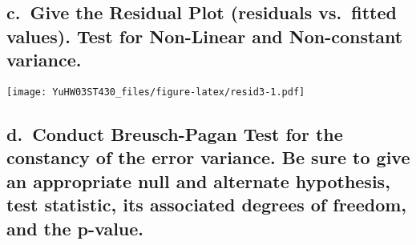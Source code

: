 \documentclass[
]{article}
\newenvironment{Shaded}{\begin{snugshade}}{\end{snugshade}}
\newcommand{\AttributeTok}[1]{\textcolor[rgb]{0.13,0.29,0.53}{#1}}
\newcommand{\DecValTok}[1]{\textcolor[rgb]{0.00,0.00,0.81}{#1}}
\newcommand{\FunctionTok}[1]{\textcolor[rgb]{0.13,0.29,0.53}{\textbf{#1}}}
\newcommand{\NormalTok}[1]{#1}
\newcommand{\OtherTok}[1]{\textcolor[rgb]{0.56,0.35,0.01}{#1}}
\newcommand{\SpecialCharTok}[1]{\textcolor[rgb]{0.81,0.36,0.00}{\textbf{#1}}}
\newcommand{\StringTok}[1]{\textcolor[rgb]{0.31,0.60,0.02}{#1}}
\begin{document}
\hypertarget{c.-give-the-residual-plot-residuals-vs.-fitted-values.-test-for-non-linear-and-non-constant-variance.-1}{%
\subsection{c.~Give the Residual Plot (residuals vs.~fitted values).
Test for Non-Linear and Non-constant
variance.}\label{c.-give-the-residual-plot-residuals-vs.-fitted-values.-test-for-non-linear-and-non-constant-variance.-1}}

\begin{Shaded}
\end{Shaded}

\texttt{[image: YuHW03ST430\_files/figure-latex/resid3-1.pdf]}

\hypertarget{d.-conduct-breusch-pagan-test-for-the-constancy-of-the-error-variance.-be-sure-to-give-an-appropriate-null-and-alternate-hypothesis-test-statistic-its-associated-degrees-of-freedom-and-the-p-value.}{%
\subsection{d.~Conduct Breusch-Pagan Test for the constancy of the error
variance. Be sure to give an appropriate null and alternate hypothesis,
test statistic, its associated degrees of freedom, and the
p-value.}\label{d.-conduct-breusch-pagan-test-for-the-constancy-of-the-error-variance.-be-sure-to-give-an-appropriate-null-and-alternate-hypothesis-test-statistic-its-associated-degrees-of-freedom-and-the-p-value.}}
\end{document}
